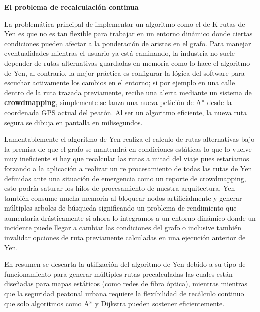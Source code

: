 \begin{itemize}
    \textbf{El problema de recalculación continua}

    La problemática principal de implementar un algoritmo como el de K rutas de Yen es que no es tan flexible para trabajar en un entorno dinámico donde ciertas condiciones pueden afectar a la ponderación de aristas en el grafo. Para manejar eventualidades mientras el usuario ya está caminando, la industria no suele depender de rutas alternativas guardadas en memoria como lo hace el algoritmo de Yen, al contrario, la mejor práctica es configurar la lógica del software para escuchar activamente los cambios en el entorno; si por ejemplo en una calle dentro de la ruta trazada previamente, recibe una alerta mediante un sistema de \textbf{crowdmapping}, simplemente se lanza una nueva petición de A* desde la coordenada GPS actual del peatón. Al ser un algoritmo eficiente, la nueva ruta segura se dibuja en pantalla en milisegundos.  

    Lamentablemente el algoritmo de Yen realiza el calculo de rutas alternativas bajo la premisa de que el grafo se mantendrá en condiciones estáticas lo que lo vuelve muy ineficiente si hay que recalcular las rutas a mitad del viaje pues estaríamos forzando a la aplicación a realizar un re procesamiento de todas las rutas de Yen definidas ante una situación de emergencia como un reporte de crowdmapping, esto podría saturar los hilos de procesamiento de nuestra arquitectura. Yen también consume mucha memoria al bloquear nodos artificialmente y generar múltiples arboles de búsqueda significando un problema de rendimiento que aumentaría drásticamente si ahora lo integramos a un entorno dinámico donde un incidente puede llegar a cambiar las condiciones del grafo o inclusive también invalidar opciones de ruta previamente calculadas en una ejecución anterior de Yen. 

    En resumen se descarta la utilización del algoritmo de Yen debido a su tipo de funcionamiento para generar múltiples rutas precalculadas las cuales están diseñadas para mapas estáticos (como redes de fibra óptica), mientras mientras que la seguridad peatonal urbana requiere la flexibilidad de recálculo continuo que solo algoritmos como A* y Dijkstra pueden sostener eficientemente.



\end{itemize}
